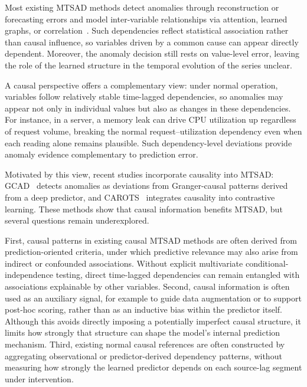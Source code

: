 \documentclass[letterpaper]{article}
\begin{document}
Most existing MTSAD methods detect anomalies through reconstruction or forecasting errors and model inter-variable relationships via attention, learned graphs, or correlation~\cite{audibert2020usad,wu2023timesnet,deng2021gdn}. Such dependencies reflect statistical association rather than causal influence, so variables driven by a common cause can appear directly dependent. Moreover, the anomaly decision still rests on value-level error, leaving the role of the learned structure in the temporal evolution of the series unclear.

A causal perspective offers a complementary view: under normal operation, variables follow relatively stable time-lagged dependencies, so anomalies may appear not only in individual values but also as changes in these dependencies. For instance, in a server, a memory leak can drive CPU utilization up regardless of request volume, breaking the normal request--utilization dependency even when each reading alone remains plausible. Such dependency-level deviations provide anomaly evidence complementary to prediction error.

Motivated by this view, recent studies incorporate causality into MTSAD: GCAD~\cite{liu2025gcad} detects anomalies as deviations from Granger-causal patterns derived from a deep predictor, and CAROTS~\cite{kim2025carots} integrates causality into contrastive learning. These methods show that causal information benefits MTSAD, but several questions remain underexplored.

First, causal patterns in existing causal MTSAD methods are often derived from prediction-oriented criteria, under which predictive relevance may also arise from indirect or confounded associations. Without explicit multivariate conditional-independence testing, direct time-lagged dependencies can remain entangled with associations explainable by other variables. Second, causal information is often used as an auxiliary signal, for example to guide data augmentation or to support post-hoc scoring, rather than as an inductive bias within the predictor itself. Although this avoids directly imposing a potentially imperfect causal structure, it limits how strongly that structure can shape the model's internal prediction mechanism. Third, existing normal causal references are often constructed by aggregating observational or predictor-derived dependency patterns, without measuring how strongly the learned predictor depends on each source-lag segment under intervention.
\end{document}
